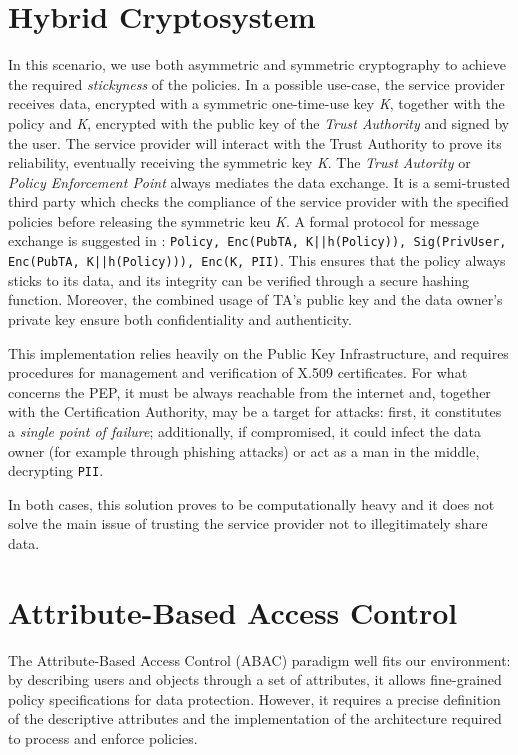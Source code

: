 \section{Hybrid Cryptosystem}
In this scenario, we use both asymmetric and symmetric cryptography to achieve the required \textit{stickyness} of the policies. In a possible use-case, the service provider receives data, encrypted with a symmetric one-time-use key \textit{K}, together with the policy and \textit{K}, encrypted with the public key of the \textit{Trust Authority} and signed by the user. The service provider will interact with the Trust Authority to prove its reliability, eventually receiving the symmetric key \textit{K}. The \textit{Trust Autority} or \textit{Policy Enforcement Point} always mediates the data exchange. It is a semi-trusted third party which checks the compliance of the service provider with the specified policies before releasing the symmetric keu \textit{K}. A formal protocol for message exchange is suggested in \cite{pearson2011sticky}: \texttt{Policy, Enc(PubTA, K||h(Policy)), Sig(PrivUser, Enc(PubTA, K||h(Policy))), Enc(K, PII)}. This ensures that the policy always sticks to its data, and its integrity can be verified through a secure hashing function. Moreover, the combined usage of TA's public key and the data owner's private key ensure both confidentiality and authenticity. 

This implementation relies heavily on the Public Key Infrastructure, and requires procedures for management and verification of X.509 certificates. For what concerns the PEP, it must be always reachable from the internet and, together with the Certification Authority, may be a target for attacks: first, it constitutes a \textit{single point of failure}; additionally, if compromised, it could infect the data owner (for example through phishing attacks) or act as a man in the middle, decrypting \texttt{PII}.

In both cases, this solution proves to be computationally heavy and it does not solve the main issue of trusting the service provider not to illegitimately share data.

\section{Attribute-Based Access Control}
The Attribute-Based Access Control (ABAC) paradigm well fits our environment: by describing users and objects through a set of attributes, it allows fine-grained policy specifications for data protection. However, it requires a precise definition of the descriptive attributes and the implementation of the architecture required to process and enforce policies.

